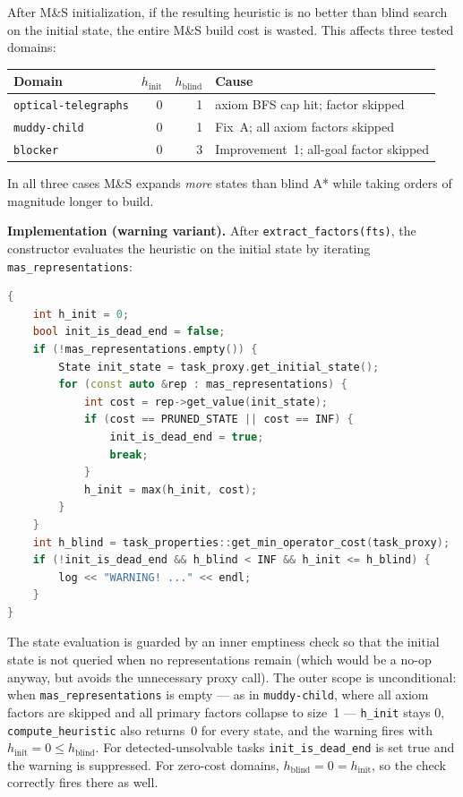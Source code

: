 \documentclass[11pt,a4paper]{article}
\begin{document}
After M\&S initialization, if the resulting heuristic is no better than blind
search on the initial state, the entire M\&S build cost is wasted.
This affects three tested domains:

\begin{center}
\small
\begin{tabular}{lrrl}
\toprule
\textbf{Domain} & $h_{\mathrm{init}}$ & $h_{\mathrm{blind}}$ & \textbf{Cause} \\
\midrule
\texttt{optical-telegraphs} & 0 & 1 & axiom BFS cap hit; factor skipped \\
\texttt{muddy-child}        & 0 & 1 & Fix~A; all axiom factors skipped \\
\texttt{blocker}            & 0 & 3 & Improvement~1; all-goal factor skipped \\
\bottomrule
\end{tabular}
\end{center}

In all three cases M\&S expands \emph{more} states than blind A* while taking
orders of magnitude longer to build.

\textbf{Implementation (warning variant).}
After \texttt{extract\_factors(fts)}, the constructor evaluates the
heuristic on the initial state by iterating \texttt{mas\_representations}:
\begin{lstlisting}[language=C++]
{
    int h_init = 0;
    bool init_is_dead_end = false;
    if (!mas_representations.empty()) {
        State init_state = task_proxy.get_initial_state();
        for (const auto &rep : mas_representations) {
            int cost = rep->get_value(init_state);
            if (cost == PRUNED_STATE || cost == INF) {
                init_is_dead_end = true;
                break;
            }
            h_init = max(h_init, cost);
        }
    }
    int h_blind = task_properties::get_min_operator_cost(task_proxy);
    if (!init_is_dead_end && h_blind < INF && h_init <= h_blind) {
        log << "WARNING! ..." << endl;
    }
}
\end{lstlisting}
The state evaluation is guarded by an inner emptiness check so that the
initial state is not queried when no representations remain (which would
be a no-op anyway, but avoids the unnecessary proxy call).  The outer
scope is unconditional: when \texttt{mas\_representations} is empty ---
as in \texttt{muddy-child}, where all axiom factors are skipped and all
primary factors collapse to size~1 --- \texttt{h\_init} stays 0,
\texttt{compute\_heuristic} also returns~0 for every state, and the
warning fires with $h_{\mathrm{init}} = 0 \leq h_{\mathrm{blind}}$.
For detected-unsolvable tasks \texttt{init\_is\_dead\_end} is set true
and the warning is suppressed.  For zero-cost domains,
$h_{\mathrm{blind}} = 0 = h_{\mathrm{init}}$, so the check correctly
fires there as well.
\end{document}
